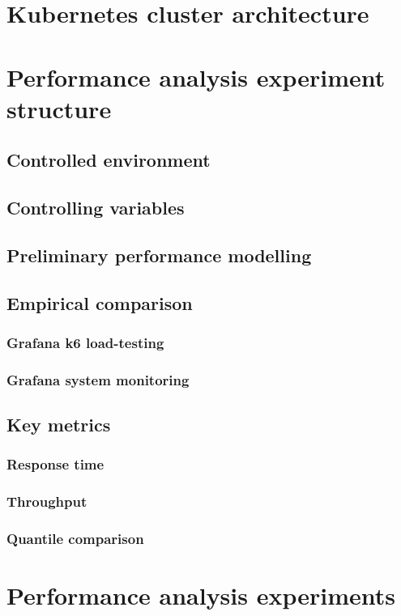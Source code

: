 \section{Kubernetes cluster architecture}

\section{Performance analysis experiment structure}
\subsection{Controlled environment}
\subsection{Controlling variables}
\subsection{Preliminary performance modelling}
\subsection{Empirical comparison}
\subsubsection{Grafana k6 load-testing}
\subsubsection{Grafana system monitoring}
\subsection{Key metrics}
\subsubsection{Response time}
\subsubsection{Throughput}
\subsubsection{Quantile comparison}

\section{Performance analysis experiments}
